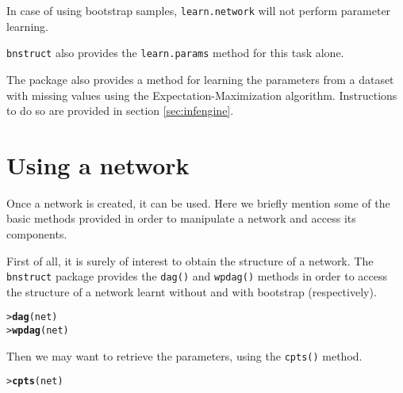\documentclass{article}\usepackage[]{graphicx}\usepackage[]{color}
\makeatletter
\newcommand{\hlstd}[1]{\textcolor[rgb]{0.345,0.345,0.345}{#1}}%
\newcommand{\hlkwd}[1]{\textcolor[rgb]{0.737,0.353,0.396}{\textbf{#1}}}%
\newenvironment{kframe}{%
 \def\at@end@of@kframe{}%
 \ifinner\ifhmode%
  \def\at@end@of@kframe{\end{minipage}}%
  \begin{minipage}{\columnwidth}%
 \fi\fi%
 \def\FrameCommand##1{\hskip\@totalleftmargin \hskip-\fboxsep
 \colorbox{shadecolor}{##1}\hskip-\fboxsep
     \hskip-\linewidth \hskip-\@totalleftmargin \hskip\columnwidth}%
 \MakeFramed {\advance\hsize-\width
   \@totalleftmargin\z@ \linewidth\hsize
   \@setminipage}}%
 {\par\unskip\endMakeFramed%
 \at@end@of@kframe}
\newenvironment{knitrout}{}{} %
\newcommand{\Robject}[1]{{\texttt{#1}}}
\newcommand{\Rpackage}[1]{{\texttt{#1}}}
\newcommand{\Rmethod}[1]{{\texttt{#1}}}
\makeatother
\begin{document}
In case of using bootstrap samples, \Rmethod{learn.network} will not perform parameter learning.

\Rpackage{bnstruct} also provides the \Rmethod{learn.params} method for this task alone.

The package also provides a method for learning the parameters from a dataset with missing values using the 
Expectation-Maximization algorithm. Instructions to do so are provided in section \ref{sec:infengine}.

% 

\section{Using a network}
Once a network is created, it can be used. Here we briefly mention some of the basic methods provided in order to
manipulate a network and access its components.

First of all, it is surely of interest to obtain the structure of a network. The \Rpackage{bnstruct} package
provides the \Rmethod{dag()} and \Rmethod{wpdag()} methods in order to access the structure of 
a network learnt without and with bootstrap (respectively).
\begin{knitrout}
\color{fgcolor}\begin{kframe}
\begin{alltt}
\hlstd{> }\hlkwd{dag}\hlstd{(net)}
\hlstd{> }\hlkwd{wpdag}\hlstd{(net)}
\end{alltt}
\end{kframe}
\end{knitrout}

Then we may want to retrieve the parameters, using the \Rmethod{cpts()} method.
\begin{knitrout}
\color{fgcolor}\begin{kframe}
\begin{alltt}
\hlstd{> }\hlkwd{cpts}\hlstd{(net)}
\end{alltt}
\end{kframe}
\end{knitrout}
\end{document}
